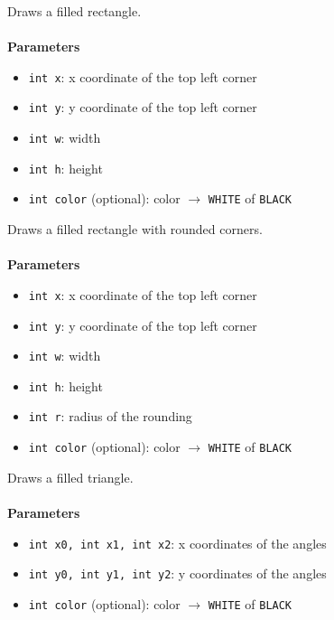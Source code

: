 \documentclass[11pt,fleqn]{book} %
\begin{document}
\begin{libf}[fillRect(x, y, w, h, \emph{color=WHITE})]
	Draws a filled rectangle.\\ \\
	\textbf{Parameters}
	\begin{itemize}
		\item \texttt{int x}: x coordinate of the top left corner
		\item \texttt{int y}: y coordinate of the top left corner
		\item \texttt{int w}: width
		\item \texttt{int h}: height
		\item \texttt{int color} (optional): color $\rightarrow$ \texttt{WHITE} of \texttt{BLACK}
	\end{itemize}
\end{libf}

\pagebreak

\begin{libf}[fillRoundRect(x, y, w, h, r, \emph{color=WHITE})]
	Draws a filled rectangle with rounded corners.\\ \\
	\textbf{Parameters}
	\begin{itemize}
		\item \texttt{int x}: x coordinate of the top left corner
		\item \texttt{int y}: y coordinate of the top left corner
		\item \texttt{int w}: width
		\item \texttt{int h}: height
		\item \texttt{int r}: radius of the rounding
		\item \texttt{int color} (optional): color $\rightarrow$ \texttt{WHITE} of \texttt{BLACK}
	\end{itemize}
\end{libf}

\begin{libf}[fillTriangle(x0, y0, x1, y1, x2, y2, \emph{color=WHITE})]
	Draws a filled triangle.\\ \\
	\textbf{Parameters}
	\begin{itemize}
		\item \texttt{int x0, int x1, int x2}: x coordinates of the angles
		\item \texttt{int y0, int y1, int y2}: y coordinates of the angles
		\item \texttt{int color} (optional): color $\rightarrow$ \texttt{WHITE} of \texttt{BLACK}
	\end{itemize}
\end{libf}
\end{document}
